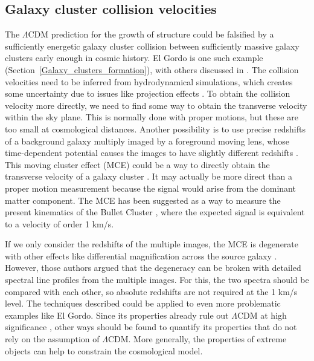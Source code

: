 \documentclass[fleqn,usenatbib,useAMS,onecolumn]{mnras} %
\begin{document}
\subsection{Galaxy cluster collision velocities}
\label{Galaxy_cluster_vtan}

The $\Lambda$CDM prediction for the growth of structure could be falsified by a sufficiently energetic galaxy cluster collision between sufficiently massive galaxy clusters early enough in cosmic history. El Gordo is one such example (Section~\ref{Galaxy_clusters_formation}), with others discussed in \citet{Asencio_2021}. The collision velocities need to be inferred from hydrodynamical simulations, which creates some uncertainty due to issues like projection effects \citep{Molnar_2013_A1750}. To obtain the collision velocity more directly, we need to find some way to obtain the transverse velocity within the sky plane. This is normally done with proper motions, but these are too small at cosmological distances. Another possibility is to use precise redshifts of a background galaxy multiply imaged by a foreground moving lens, whose time-dependent potential causes the images to have slightly different redshifts \citep{Birkinshaw_1983}. This moving cluster effect (MCE) could be a way to directly obtain the transverse velocity of a galaxy cluster \citep{Molnar_2003}. It may actually be more direct than a proper motion measurement because the signal would arise from the dominant matter component. The MCE has been suggested as a way to measure the present kinematics of the Bullet Cluster \citep{Molnar_2013_MCE}, where the expected signal is equivalent to a velocity of order 1 km/s.

If we only consider the redshifts of the multiple images, the MCE is degenerate with other effects like differential magnification across the source galaxy \citep{Banik_2015}. However, those authors argued that the degeneracy can be broken with detailed spectral line profiles from the multiple images. For this, the two spectra should be compared with each other, so absolute redshifts are not required at the 1 km/s level. The techniques described could be applied to even more problematic examples like El Gordo. Since its properties already rule out $\Lambda$CDM at high significance \citep{Asencio_2021}, other ways should be found to quantify its properties that do not rely on the assumption of $\Lambda$CDM. More generally, the properties of extreme objects can help to constrain the cosmological model.
\end{document}
